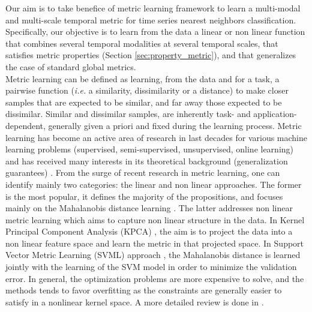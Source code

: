 Our aim is to take benefice of metric learning framework \cite{Weinberger2009a,Bellet2012} to learn a multi-modal and multi-scale temporal metric for time series nearest neighbors classification. Specifically, our objective is to learn from the data a linear or non linear function that combines several temporal modalities at several temporal scales, that satisfies metric properties (Section \ref{sec:property_metric}), and that generalizes the case of standard global metrics. \\
Metric learning can be defined as learning, from the data and for a task, a pairwise function (\textit{i.e.} a similarity, dissimilarity or a distance) to make closer samples that are expected to be similar, and far away those expected to be dissimilar. Similar and dissimilar samples, are inherently task- and application-dependent, generally given a priori and fixed during the learning process. Metric learning has become an active area of research in last decades for various machine learning problems (supervised, semi-supervised, unsupervised, online learning) and has received many interests in its theoretical background (generalization guarantees) \cite{Bellet2013a}. From the surge of recent research in metric learning, one can identify mainly two categories: the linear and non linear approaches. The former is the most popular, it defines the majority of the propositions, and focuses mainly on the Mahalanobis distance learning \cite{Weinberger2009}. The latter addresses non linear metric learning which aims to capture non linear structure in the data. In Kernel Principal Component Analysis (KPCA) \cite{Zhang2010,Chatpatanasiri2010}, the aim is to project the data into a non linear feature space and learn the metric in that projected space. In Support Vector Metric Learning (SVML) approach \cite{Xu2012}, the Mahalanobis distance is learned jointly with the learning of the SVM model in order to minimize the validation error. In general, the optimization problems are more expensive to solve, and the methods tends to favor overfitting as the constraints are generally easier to satisfy in a nonlinear kernel space. A more detailed review is done in \cite{Bellet2013a}.\\
